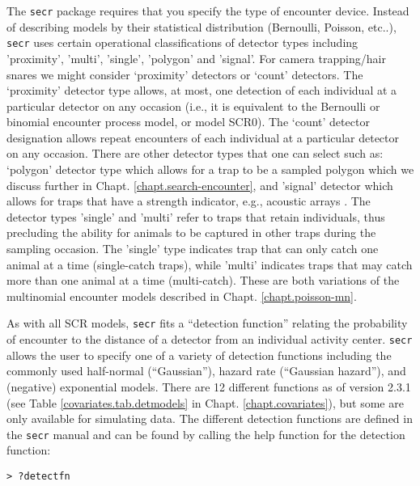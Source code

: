 The \mbox{\tt secr} package requires that you specify the type of
encounter device.  Instead of describing models by their statistical
distribution (Bernoulli, Poisson, etc..), \mbox{\tt secr} uses certain
operational classifications of detector types including 'proximity',
'multi', 'single', 'polygon' and 'signal'.  For camera trapping/hair
snares we might consider `proximity' detectors or `count' detectors.
The `proximity' detector type allows, at most, one detection of each
individual at a particular detector on any occasion (i.e., it is
equivalent to the Bernoulli or binomial encounter process model, or
model SCR0).  The `count' detector designation allows repeat
encounters of each individual at a particular detector on any
occasion.  There are other detector types that one can select such as:
`polygon' detector type which allows for a trap to be a sampled
polygon \citep{royle_young:2008} which we discuss further in
Chapt. \ref{chapt.search-encounter}, and 'signal' detector which
allows for traps that have a strength indicator, e.g., acoustic arrays
\citep{dawson_efford:2009}.
The detector types 'single' and 'multi' 
refer to traps that retain individuals, thus precluding the ability
for animals to be captured in other traps during the sampling
occasion.  The 'single' type indicates trap that can only catch one
animal at a time (single-catch traps), while 'multi' indicates traps that may catch more
than one animal at a time (multi-catch). These are both variations of
the multinomial encounter models described in
Chapt. \ref{chapt.poisson-mn}.

As with all SCR models, \mbox{\tt secr} fits a ``detection function'' relating
the probability of encounter to the distance of a detector from an
individual activity center. \mbox{\tt secr} allows the user to specify one of a
variety of detection functions including the commonly used
half-normal (``Gaussian''), hazard rate (``Gaussian hazard''), and
(negative) exponential models.  There are 12 different
functions as of version 2.3.1 (see Table \ref{covariates.tab.detmodels} in Chapt. \ref{chapt.covariates}), but
some are only available for simulating data.
The different detection functions are defined in
the \mbox{\tt secr} manual and can be found by calling the help function for the
detection function:
\begin{verbatim}
> ?detectfn
\end{verbatim}

